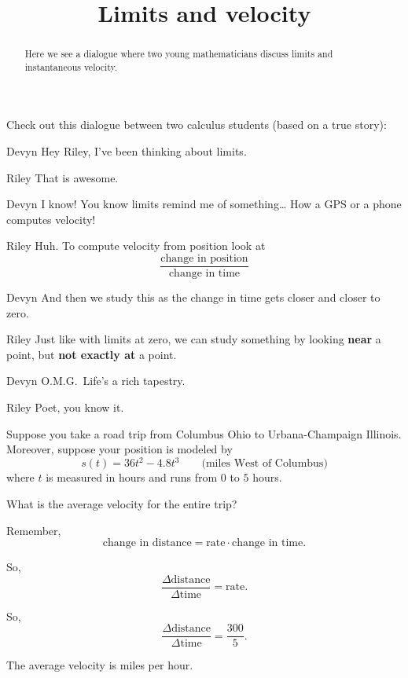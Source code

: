\documentclass{ximera}
\title[Break-Ground:]{Limits and velocity}
\begin{document}
\begin{abstract}
Here we see a dialogue where two young mathematicians discuss limits
and instantaneous velocity.
\end{abstract}
\maketitle

Check out this dialogue between two calculus students (based on a true
story):

\begin{dialogue}
\item[Devyn] Hey Riley, I've been thinking about limits.
\item[Riley] That is awesome.
\item[Devyn] I know! You know limits remind me of something\dots
  How a GPS or a phone computes velocity!
\item[Riley] Huh. To compute velocity from position look at
  \[
  \frac{\text{change in position}}{\text{change in time}}
  \]
\item[Devyn] And then we study this as the change in time gets closer
  and closer to zero.
\item[Riley] Just like with limits at zero, we can study something by
  looking \textbf{near} a point, but \textbf{not exactly at} a point.
\item[Devyn] O.M.G.\ Life's a rich tapestry.
\item[Riley] Poet, you know it.
\end{dialogue}



Suppose you take a road trip from Columbus Ohio to Urbana-Champaign
Illinois. Moreover, suppose your position is modeled by
\[
s(t) = 36t^2 -4.8t^3 \qquad\text{(miles West of Columbus)} %
\]
where $t$ is measured in hours and runs from $0$ to $5$ hours. 


\begin{problem}
  What is the average velocity for the entire trip?
  \begin{hint}
    Remember, 
    \[
    \text{change in distance} = \text{rate}\cdot\text{change in time}.
    \]
  \end{hint}
  \begin{hint}
    So, 
    \[
    \frac{\Delta\text{distance}}{\Delta\text{time}} = \text{rate}.
    \]
  \end{hint}
  \begin{hint}
    So, 
    \[
    \frac{\Delta\text{distance}}{\Delta\text{time}} = \frac{300}{5}.
    \]
  \end{hint}
  \begin{prompt}
    The average velocity is  miles per hour.
  \end{prompt}
\end{problem}
\end{document}
